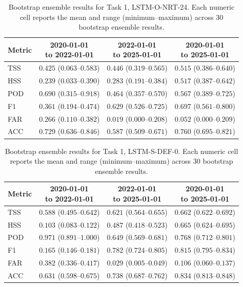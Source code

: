 \begin{table}[htbp]
\centering
\small
\caption{Bootstrap ensemble results for Task 1, LSTM-O-NRT-24. Each numeric cell reports the mean and range (minimum--maximum) across 30 bootstrap ensemble results.}
\label{tab:app-task1-lstm-o-nrt-24}
\begin{tabular}{lccc}
\toprule
Metric & \shortstack{2020-01-01\\to 2022-01-01} & \shortstack{2022-01-01\\to 2025-01-01} & \shortstack{2020-01-01\\to 2025-01-01} \\
\midrule
TSS & $0.425$ ($0.063$--$0.583$) & $0.446$ ($0.319$--$0.565$) & $0.515$ ($0.386$--$0.640$) \\
HSS & $0.239$ ($0.033$--$0.390$) & $0.283$ ($0.191$--$0.384$) & $0.517$ ($0.387$--$0.642$) \\
POD & $0.690$ ($0.315$--$0.918$) & $0.464$ ($0.357$--$0.570$) & $0.567$ ($0.389$--$0.725$) \\
F1 & $0.361$ ($0.194$--$0.474$) & $0.629$ ($0.526$--$0.725$) & $0.697$ ($0.561$--$0.800$) \\
FAR & $0.266$ ($0.110$--$0.382$) & $0.019$ ($0.000$--$0.208$) & $0.052$ ($0.000$--$0.209$) \\
ACC & $0.729$ ($0.636$--$0.846$) & $0.587$ ($0.509$--$0.671$) & $0.760$ ($0.695$--$0.821$) \\
\bottomrule
\end{tabular}
\end{table}
\clearpage

\begin{table}[htbp]
\centering
\small
\caption{Bootstrap ensemble results for Task 1, LSTM-S-DEF-0. Each numeric cell reports the mean and range (minimum--maximum) across 30 bootstrap ensemble results.}
\label{tab:app-task1-lstm-s-def-0}
\begin{tabular}{lccc}
\toprule
Metric & \shortstack{2020-01-01\\to 2022-01-01} & \shortstack{2022-01-01\\to 2025-01-01} & \shortstack{2020-01-01\\to 2025-01-01} \\
\midrule
TSS & $0.588$ ($0.495$--$0.642$) & $0.621$ ($0.564$--$0.655$) & $0.662$ ($0.622$--$0.692$) \\
HSS & $0.103$ ($0.083$--$0.122$) & $0.487$ ($0.418$--$0.523$) & $0.665$ ($0.624$--$0.695$) \\
POD & $0.971$ ($0.891$--$1.000$) & $0.649$ ($0.569$--$0.681$) & $0.768$ ($0.712$--$0.801$) \\
F1 & $0.165$ ($0.146$--$0.181$) & $0.782$ ($0.724$--$0.805$) & $0.815$ ($0.795$--$0.834$) \\
FAR & $0.382$ ($0.336$--$0.417$) & $0.029$ ($0.005$--$0.049$) & $0.106$ ($0.060$--$0.137$) \\
ACC & $0.631$ ($0.598$--$0.675$) & $0.738$ ($0.687$--$0.762$) & $0.834$ ($0.813$--$0.848$) \\
\bottomrule
\end{tabular}
\end{table}
\clearpage

